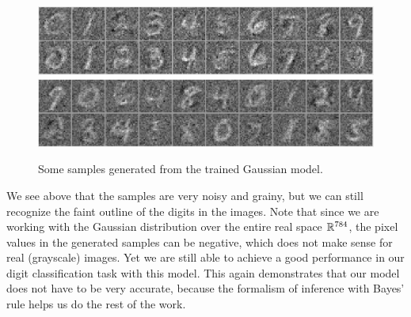 \documentclass[11pt]{article}
\begin{document}
\begin{figure}[h!]
\centering
\includegraphics[scale=0.4]{gaussiansamples_ordered} \\
\includegraphics[scale=0.4]{gaussiansamples_random}
\caption{Some samples generated from the trained Gaussian model.}
\label{fig:gaussiansamples}
\end{figure}


We see above that the samples are very noisy and grainy, but we can still recognize the faint outline of the digits in the images. Note that since we are working with the Gaussian distribution over the entire real space $\mathbb{R}^{784}$, the pixel values in the generated samples can be negative, which does not make sense for real (grayscale) images. Yet we are still able to achieve a good performance in our digit classification task with this model. This again demonstrates that our model does not have to be very accurate, because the formalism of inference with Bayes' rule helps us do the rest of the work.
\end{document}
